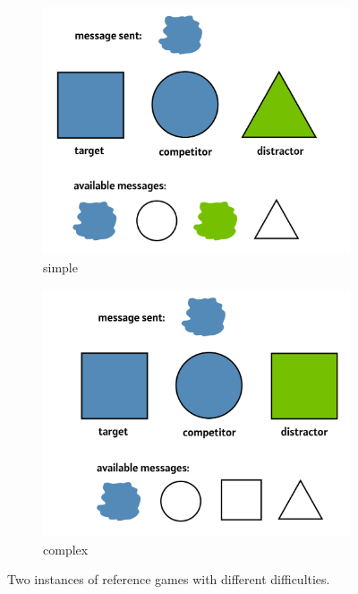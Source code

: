 \documentclass[11pt,a4paper]{article}
\begin{document}
\begin{figure}
\centering
\begin{subfigure}{.5\textwidth}
  \centering
  \includegraphics[width=1\linewidth]{images/simple.png}
  \caption{simple}
  \label{fig:simple}
\end{subfigure}%
\begin{subfigure}{.5\textwidth}
  \centering
  \includegraphics[width=1\linewidth]{images/complex.png}
  \caption{complex}
  \label{fig:complex}
\end{subfigure}
\caption{Two instances of reference games with different difficulties. }
\label{fig:simple_complex}
\end{figure}
\end{document}
